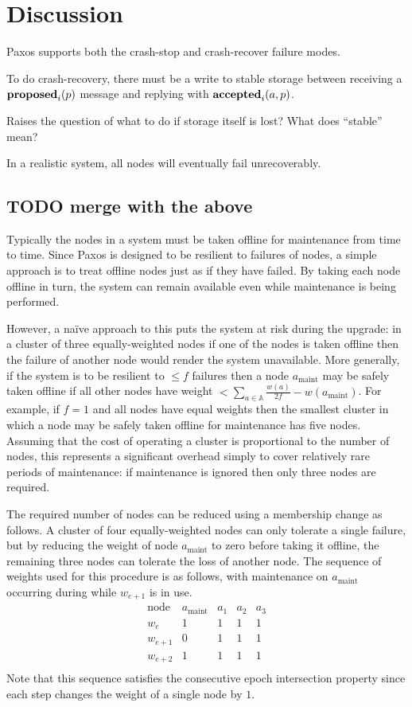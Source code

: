 \documentclass[journal]{IEEEtran}
\begin{document}
\section{Discussion}

Paxos supports both the crash-stop and crash-recover failure modes.

To do crash-recovery, there must be a write to stable storage between
receiving a $\mathbf{proposed}_{i}(p)$ message and replying with $\mathbf{accepted}_{i}(a,p)$.

Raises the question of what to do if storage itself is lost? What does
``stable'' mean?

In a realistic system, all nodes will eventually fail unrecoverably.





\subsection{TODO merge with the above}

Typically the nodes in a system must be taken offline for maintenance from time
to time. Since Paxos is designed to be resilient to failures of nodes, a simple
approach is to treat offline nodes just as if they have failed. By taking each
node offline in turn, the system can remain available even while maintenance is
being performed.

However, a na\"ive approach to this puts the system at risk during the upgrade:
in a cluster of three equally-weighted nodes if one of the nodes is taken
offline then the failure of another node would render the system unavailable.
More generally, if the system is to be resilient to $\le f$ failures then a
node $a_{\textrm{maint}}$ may be safely taken offline if all other nodes have
weight $< \sum_{a \in \mathbb A} \frac{w(a)}{2f} - w(a_{\textrm{maint}})$. For
example, if $f = 1$ and all nodes have equal weights then the smallest cluster
in which a node may be safely taken offline for maintenance has five nodes.
Assuming that the cost of operating a cluster is proportional to the number of
nodes, this represents a significant overhead simply to cover relatively rare
periods of maintenance: if maintenance is ignored then only three nodes are
required.

The required number of nodes can be reduced using a membership change as
follows. A cluster of four equally-weighted nodes can only tolerate a single
failure, but by reducing the weight of node $a_{\textrm{maint}}$ to zero before
taking it offline, the remaining three nodes can tolerate the loss of another
node. The sequence of weights used for this procedure is as follows, with
maintenance on $a_{\textrm{maint}}$ occurring during while $w_{e+1}$ is in use.
\[\begin{array}{rcccc}
\textrm{node}&a_{\textrm{maint}}&a_1&a_2&a_3 \\
w_e&1&1&1&1\\
w_{e+1}&0&1&1&1\\
w_{e+2}&1&1&1&1\\
\end{array}\]
Note that this sequence satisfies the consecutive epoch intersection property
since each step changes the weight of a single node by $1$.
\end{document}
